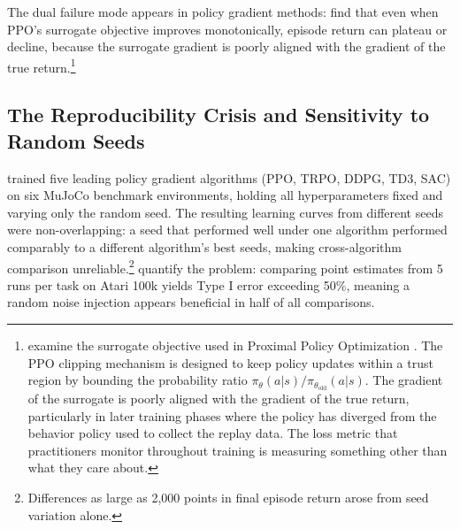 The dual failure mode appears in policy gradient methods: \citet{IlyasFang2020} find that even when PPO's surrogate objective improves monotonically, episode return can plateau or decline, because the surrogate gradient is poorly aligned with the gradient of the true return.\footnote{\citet{IlyasFang2020} examine the surrogate objective used in Proximal Policy Optimization \citep{Schulman2017}. The PPO clipping mechanism is designed to keep policy updates within a trust region by bounding the probability ratio $\pi_\theta(a|s)/\pi_{\theta_{\text{old}}}(a|s)$. The gradient of the surrogate is poorly aligned with the gradient of the true return, particularly in later training phases where the policy has diverged from the behavior policy used to collect the replay data. The loss metric that practitioners monitor throughout training is measuring something other than what they care about.}

\subsection{The Reproducibility Crisis and Sensitivity to Random Seeds}
\label{sec:reproducibility}

\citet{henderson2018deep} trained five leading policy gradient algorithms (PPO, TRPO, DDPG, TD3, SAC) on six MuJoCo benchmark environments, holding all hyperparameters fixed and varying only the random seed. The resulting learning curves from different seeds were non-overlapping: a seed that performed well under one algorithm performed comparably to a different algorithm's best seeds, making cross-algorithm comparison unreliable.\footnote{Differences as large as 2,000 points in final episode return arose from seed variation alone.} \citet{Agarwal2021} quantify the problem: comparing point estimates from 5 runs per task on Atari 100k yields Type I error exceeding 50\%, meaning a random noise injection appears beneficial in half of all comparisons.

